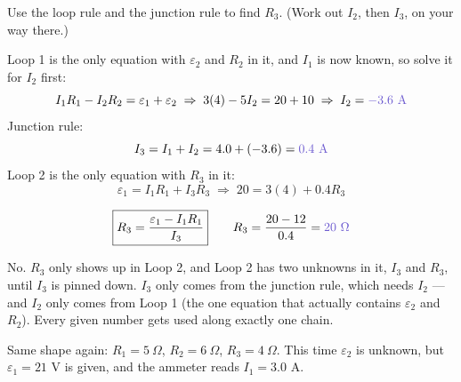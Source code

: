 \documentclass[12pt]{article}
\newcommand{\ANS}[1]{\textcolor{accent}{#1}}
\newcommand{\reszig}[1]{%
  \fill[white] ($(#1)+(-0.65,-0.32)$) rectangle ($(#1)+(0.65,0.32)$);
  \draw ($(#1)+(-0.6,0)$)
    -- ($(#1)+(-0.42,0.22)$) -- ($(#1)+(-0.24,-0.22)$)
    -- ($(#1)+(-0.06,0.22)$) -- ($(#1)+(0.12,-0.22)$)
    -- ($(#1)+(0.3,0.22)$) -- ($(#1)+(0.48,-0.22)$)
    -- ($(#1)+(0.6,0)$);
}
\newcommand{\metercirc}[2]{%
  \fill[white] ($(#1)+(-0.3,-0.3)$) rectangle ($(#1)+(0.3,0.3)$);
  \draw ($(#1)$) circle (0.3);
  \node[scale=0.8] at (#1) {$#2$};
}
\newcommand{\batthL}[1]{%
  \draw[line width=0.7pt] ($(#1)+(-0.55,0)$) -- ($(#1)+(-0.12,0)$);
  \draw[line width=0.7pt] ($(#1)+(0.12,0)$) -- ($(#1)+(0.55,0)$);
  \draw[line width=1.1pt] ($(#1)+(-0.12,-0.35)$) -- ($(#1)+(-0.12,0.35)$);
  \draw[line width=2.4pt] ($(#1)+(0.12,-0.2)$) -- ($(#1)+(0.12,0.2)$);
  \node[scale=0.75] at ($(#1)+(-0.12,0.55)$) {$+$};
  \node[scale=0.75] at ($(#1)+(0.12,0.55)$) {$-$};
}
\newcommand{\batthR}[1]{%
  \draw[line width=0.7pt] ($(#1)+(-0.55,0)$) -- ($(#1)+(-0.12,0)$);
  \draw[line width=0.7pt] ($(#1)+(0.12,0)$) -- ($(#1)+(0.55,0)$);
  \draw[line width=2.4pt] ($(#1)+(-0.12,-0.2)$) -- ($(#1)+(-0.12,0.2)$);
  \draw[line width=1.1pt] ($(#1)+(0.12,-0.35)$) -- ($(#1)+(0.12,0.35)$);
  \node[scale=0.75] at ($(#1)+(-0.12,0.55)$) {$-$};
  \node[scale=0.75] at ($(#1)+(0.12,0.55)$) {$+$};
}
\newcommand{\reszigv}[1]{%
  \fill[white] ($(#1)+(-0.32,-0.65)$) rectangle ($(#1)+(0.32,0.65)$);
  \draw ($(#1)+(0,-0.6)$)
    -- ($(#1)+(0.22,-0.42)$) -- ($(#1)+(-0.22,-0.24)$)
    -- ($(#1)+(0.22,-0.06)$) -- ($(#1)+(-0.22,0.12)$)
    -- ($(#1)+(0.22,0.3)$) -- ($(#1)+(-0.22,0.48)$)
    -- ($(#1)+(0,0.6)$);
}
\newcommand{\twoloopdots}{%
  \filldraw (0,4) circle (1.5pt); \node[scale=0.8, anchor=south east] at (-0.05,4.05) {$e$};
  \filldraw (6,4) circle (1.5pt); \node[scale=0.8, anchor=south west] at (6.05,4.05) {$f$};
  \filldraw (0,2) circle (1.5pt); \node[scale=0.8, anchor=east] at (-0.1,2) {$b$};
  \filldraw (6,2) circle (1.5pt); \node[scale=0.8, anchor=west] at (6.1,2) {$c$};
  \filldraw (0,0) circle (1.5pt); \node[scale=0.8, anchor=north east] at (-0.05,-0.05) {$a$};
  \filldraw (6,0) circle (1.5pt); \node[scale=0.8, anchor=north west] at (6.05,-0.05) {$d$};
}
\begin{document}
Use the loop rule and the junction rule to find $R_3$. (Work out $I_2$,
then $I_3$, on your way there.)

{\small
Loop 1 is the only equation with $\varepsilon_2$ and $R_2$ in it, and $I_1$
is now known, so solve it for $I_2$ first:
\[
I_1R_1-I_2R_2=\varepsilon_1+\varepsilon_2 \;\Rightarrow\;
3(4)-5I_2=20+10 \;\Rightarrow\; I_2=\ANS{-3.6\text{ A}}
\]
Junction rule:
\[
I_3=I_1+I_2=4.0+(-3.6)=\ANS{0.4\text{ A}}
\]
Loop 2 is the only equation with $R_3$ in it:
\[
\varepsilon_1=I_1R_1+I_3R_3 \;\Rightarrow\; 20=3(4)+0.4R_3
\]}

\[
\boxed{R_3 = \dfrac{\varepsilon_1-I_1R_1}{I_3}} \qquad
R_3=\dfrac{20-12}{0.4}=\ANS{20\ \Omega}
\]


{\small\color{accent} No. $R_3$ only shows up in Loop 2, and Loop 2 has two
unknowns in it, $I_3$ and $R_3$, until $I_3$ is pinned down. $I_3$ only
comes from the junction rule, which needs $I_2$ --- and $I_2$ only comes
from Loop 1 (the one equation that actually contains $\varepsilon_2$ and
$R_2$). Every given number gets used along exactly one chain.}


Same shape again: $R_1=5\ \Omega$, $R_2=6\ \Omega$, $R_3=4\ \Omega$. This
time $\varepsilon_2$ is unknown, but $\varepsilon_1=21$ V is given, and the
ammeter reads $I_1=3.0$ A.

\begin{center}
\end{center}
\end{document}
